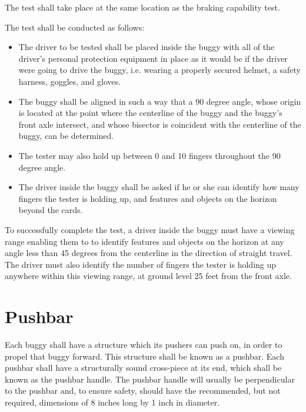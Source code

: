 	\noindent The test shall take place at the same location as the braking capability test.
	\newline

	\noindent The test shall be conducted as follows:

	\begin{itemize}

		\item
		The driver to be tested shall be placed inside the buggy with all of the
		driver's personal protection equipment in place as it would be if the driver
		were going to drive the buggy, i.e. wearing a properly secured helmet, a safety
		harness, goggles, and gloves.

		\item
		The buggy shall be aligned in such a way that a 90 degree angle, whose origin
		is located at the point where the centerline of the buggy and the buggy's front
		axle intersect, and whose bisector is coincident with the centerline of the
		buggy, can be determined.

		\item
		The tester may also hold up between 0 and 10 fingers throughout the 90 degree angle.

		\item
		The driver inside the buggy shall be asked if he or she can identify how many fingers 
		the tester is holding up, and features and objects on the horizon beyond the cards.

	\end{itemize}

	To successfully complete the test, a driver inside the buggy must have a 
	viewing range enabling them to to identify features and objects on the horizon at 
	any angle less than 45 degrees from the centerline in the direction of straight 
	travel. The driver must also identify the number of fingers the tester is holding 
	up anywhere within this viewing range, at ground level 25 feet from the front axle.
	
\section{Pushbar}

	Each buggy shall have a structure which its pushers can push on, in order to
	propel that buggy forward. This structure shall be known as a pushbar. Each
	pushbar shall have a structurally sound cross-piece at its end, which shall be
	known as the pushbar handle. The pushbar handle will usually be perpendicular
	to the pushbar and, to ensure safety, should have the recommended, but not
	required, dimensions of 8 inches long by 1 inch in diameter.

